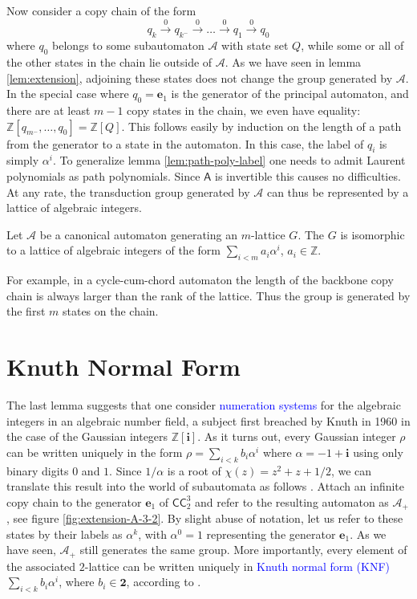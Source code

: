 \documentclass[12pt]{svmult}
\def\emph#1{\textcolor{blue}{#1}}
\def\2{\mathbf{2}}
\def\CCC#1#2{\mathsf{CC}^{#1}_{#2}}
\def\cA{\mathcal{A}}
\def\ii{\mathbf{i}}
\def\pre#1{{#1}^{-}}
\def\Z{\mathbb{Z}}
\def\AA{\mathsf{A}}             %
\def\ZM#1{\Z[{#1}]}               %
\def\unvo{\mathbf{e}_{1}}
\begin{document}
Now consider a copy chain of the form 
%
$$
    q_{k} \stackrel{0}{\longrightarrow} q_{\pre{k}} \stackrel{0}{\longrightarrow} \ldots %
    \stackrel{0}{\longrightarrow} q_{1} \stackrel{0}{\longrightarrow} q_{0}
$$
%
where $q_0$ belongs to some subautomaton $\cA$ with state set $Q$, while some or all of the 
other states in the chain lie outside of $\cA$.
As we have seen in lemma \ref{lem:extension}, adjoining these states does not change the 
group generated by $\cA$. 
In the special case where $q_0 = \unvo$ is the generator of the principal automaton, 
and there are at least $m-1$ copy states in the chain, we even have equality: 
$\ZM{q_{\pre{m}},\ldots,q_{0}} = \ZM{Q}$.  
This follows easily by induction on the length of a path from the generator to a state 
in the automaton. 
In this case, the label of $q_i$ is simply $\alpha^{i}$. 
To generalize lemma \ref{lem:path-poly-label} one needs to admit Laurent polynomials 
as path polynomials. 
Since $\AA$ is invertible this causes no difficulties. 
At any rate, the transduction group generated by $\cA$ can thus be represented by a lattice
of  algebraic integers. 

\begin{lemma}
\label{lem:lattice-iso}
Let $\cA$ be a canonical automaton generating an $m$-lattice $G$. 
The $G$ is isomorphic to a lattice
of  algebraic integers of the form $\sum_{i<m} a_{i} \alpha^{i}$, $a_{i} \in \Z$. 
\end{lemma}

For example, in a cycle-cum-chord automaton the length of the backbone copy chain
is always larger than the rank of the lattice. 
Thus the group is generated by the first $m$ states on the chain. 

\section{Knuth Normal Form}
\label{sec:knuth-normal-form}

The last lemma suggests that one consider \emph{numeration systems} for 
the algebraic integers in an algebraic number field, a subject first breached by Knuth in 
1960  \cite{Knuth60:number_system} in the case of the Gaussian integers $\Z[\ii]$. 
As it turns out, every Gaussian integer $\rho$ can be written uniquely in the form 
$\rho = \sum_{i<k} b_{i} \alpha^{i}$ where $\alpha = -1 + \ii$ using only 
binary digits $0$ and $1$. 
Since $1/\alpha$ is a root of  $\chi(z) = z^{2} + z + 1/2$, we can translate this result 
into the world of subautomata as follows \cite{Knuth10:privcomm}.
Attach an infinite copy chain to the generator $\unvo$ of $\CCC{3}{2}$ and refer to the resulting 
automaton as $\cA_{+}$, see figure \ref{fig:extension-A-3-2}.
By slight abuse of notation, let us refer to these states by their labels as 
$\alpha^{k}$, with $\alpha^{0} = 1$ representing the generator $\unvo$. 
As we have seen, $\cA_{+}$ still generates the same group. 
More importantly, every element of the associated $2$-lattice can be written uniquely 
in \emph{Knuth normal form (KNF)} $\sum_{i<k} b_{i} \alpha^{i}$, where $b_{i} \in \2$, 
according to \cite{SutnerLewi12:iter_inver_bin_trans,Knuth60:number_system}.  
\end{document}
